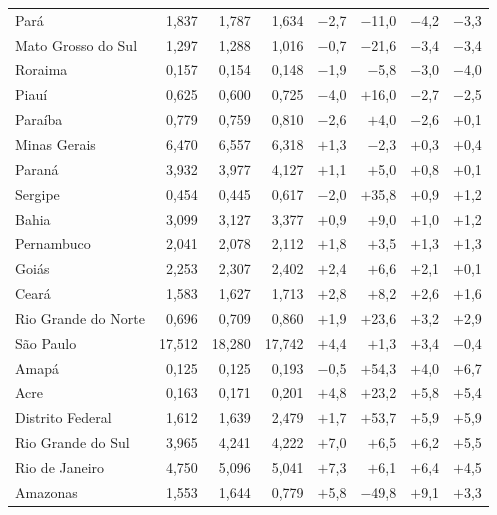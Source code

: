 \begin{longtable}{@{}>{\raggedright\arraybackslash}p{3.15cm}*{3}{r}rrrr@{}}
Pará & 1,837 & 1,787 & 1,634 & $-$2,7 & $-$11,0 & $-$4,2 & $-$3,3 \\
Mato Grosso do Sul & 1,297 & 1,288 & 1,016 & $-$0,7 & $-$21,6 & $-$3,4 & $-$3,4 \\
Roraima & 0,157 & 0,154 & 0,148 & $-$1,9 & $-$5,8 & $-$3,0 & $-$4,0 \\
Piauí & 0,625 & 0,600 & 0,725 & $-$4,0 & $+$16,0 & $-$2,7 & $-$2,5 \\
Paraíba & 0,779 & 0,759 & 0,810 & $-$2,6 & $+$4,0 & $-$2,6 & $+$0,1 \\
Minas Gerais & 6,470 & 6,557 & 6,318 & $+$1,3 & $-$2,3 & $+$0,3 & $+$0,4 \\
Paraná & 3,932 & 3,977 & 4,127 & $+$1,1 & $+$5,0 & $+$0,8 & $+$0,1 \\
Sergipe & 0,454 & 0,445 & 0,617 & $-$2,0 & $+$35,8 & $+$0,9 & $+$1,2 \\
Bahia & 3,099 & 3,127 & 3,377 & $+$0,9 & $+$9,0 & $+$1,0 & $+$1,2 \\
Pernambuco & 2,041 & 2,078 & 2,112 & $+$1,8 & $+$3,5 & $+$1,3 & $+$1,3 \\
Goiás & 2,253 & 2,307 & 2,402 & $+$2,4 & $+$6,6 & $+$2,1 & $+$0,1 \\
Ceará & 1,583 & 1,627 & 1,713 & $+$2,8 & $+$8,2 & $+$2,6 & $+$1,6 \\
Rio Grande do Norte & 0,696 & 0,709 & 0,860 & $+$1,9 & $+$23,6 & $+$3,2 & $+$2,9 \\
São Paulo & 17,512 & 18,280 & 17,742 & $+$4,4 & $+$1,3 & $+$3,4 & $-$0,4 \\
Amapá & 0,125 & 0,125 & 0,193 & $-$0,5 & $+$54,3 & $+$4,0 & $+$6,7 \\
Acre & 0,163 & 0,171 & 0,201 & $+$4,8 & $+$23,2 & $+$5,8 & $+$5,4 \\
Distrito Federal & 1,612 & 1,639 & 2,479 & $+$1,7 & $+$53,7 & $+$5,9 & $+$5,9 \\
Rio Grande do Sul & 3,965 & 4,241 & 4,222 & $+$7,0 & $+$6,5 & $+$6,2 & $+$5,5 \\
Rio de Janeiro & 4,750 & 5,096 & 5,041 & $+$7,3 & $+$6,1 & $+$6,4 & $+$4,5 \\
Amazonas & 1,553 & 1,644 & 0,779 & $+$5,8 & $-$49,8 & $+$9,1 & $+$3,3 \\
\end{longtable}
\addtocounter{table}{-1}
